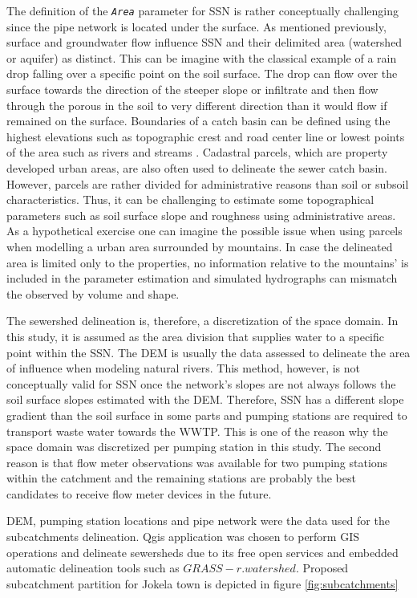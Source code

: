 The definition of the \texttt{\textit{Area}} parameter for \acf{SSN} is rather conceptually challenging since the pipe network is located under the surface. As mentioned previously, surface and groundwater flow influence \ac{SSN} and their delimited area (watershed or aquifer) as distinct. This can be imagine with the classical example of a rain drop falling over a specific point on the soil surface. The drop can flow over the surface towards the direction of the steeper slope or infiltrate and then flow through the porous in the soil to very different direction than it would flow if remained on the surface. Boundaries of a catch basin can be defined using the highest elevations such as topographic crest and road center line or lowest points of the area such as rivers and streams \cite{Lee2017}. Cadastral parcels, which are property developed urban areas, are also often used to delineate the sewer catch basin. However, parcels are rather divided for administrative reasons than soil or subsoil characteristics. Thus, it can be challenging to estimate some topographical parameters such as soil surface slope and roughness using administrative areas. As a hypothetical exercise one can imagine the possible issue when using parcels when modelling a urban area surrounded by mountains. In case the delineated area is limited only to the properties, no information relative to the mountains' is included in the parameter estimation and simulated hydrographs can mismatch the observed by volume and shape.

The sewershed delineation is, therefore, a discretization of the space domain. In this study, it is assumed as the area division that supplies water to a specific point within the \ac{SSN}. The DEM is usually the data assessed to delineate the area of influence when modeling natural rivers. This method, however, is not conceptually valid for \ac{SSN} once the network's slopes are not always follows the soil surface slopes estimated with the DEM. Therefore, \ac{SSN} has a different slope gradient than the soil surface in some parts and pumping stations are required to transport waste water towards the \acf{WWTP}. This is one of the reason why the space domain was discretized per pumping station in this study. The second reason is that flow meter observations was available for two pumping stations within the catchment and the remaining stations are probably the best candidates to receive flow meter devices in the future. 

DEM, pumping station locations and pipe network were the data used for the subcatchments delineation. Qgis application was chosen to perform GIS operations and delineate sewersheds due to its free open services and embedded automatic delineation tools such as $GRASS - r.watershed$. Proposed subcatchment partition for Jokela town is depicted in figure \ref{fig:subcatchments}

